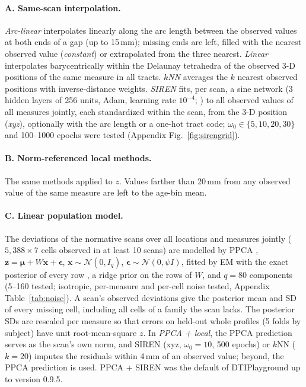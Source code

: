 \documentclass[11pt]{article}
\begin{document}
\paragraph{A. Same-scan interpolation.} \emph{Arc-linear} interpolates linearly along the arc length between the
observed values at both ends of a gap (up to 15\,mm); missing ends are left, filled with the nearest observed value
(\emph{constant}) or extrapolated from the three nearest. \emph{Linear} interpolates barycentrically within the Delaunay
tetrahedra of the observed 3-D positions of the same measure in all tracts. \emph{$k$NN} averages the $k$ nearest
observed positions with inverse-distance weights. \emph{SIREN} \citep{sitzmann2020siren} fits, per scan, a sine network
(3 hidden layers of 256 units, Adam, learning rate $10^{-4}$; \citealp{kingma2015adam}) to all observed values of all
measures jointly, each standardized within the scan, from the 3-D position (\emph{xyz}), optionally with the arc length
or a one-hot tract code; $\omega_0\in\{5,10,20,30\}$ and 100--1000 epochs were tested (Appendix
Fig.~\ref{fig:sirengrid}).

\paragraph{B. Norm-referenced local methods.} The same methods applied to $z$. Values farther than 20\,mm from any
observed value of the same measure are left to the age-bin mean.

\paragraph{C. Linear population model.} The deviations of the normative scans over all locations and measures jointly
($5{,}388\times7$ cells observed in at least 10 scans) are modelled by PPCA \citep{tipping1999ppca},
$\mathbf z=\boldsymbol\mu+W\mathbf x+\boldsymbol\epsilon$, $\mathbf x\sim\mathcal N(0,I_q)$,
$\boldsymbol\epsilon\sim\mathcal N(0,\psi I)$, fitted by EM with the exact posterior of every row
\citep{ilin2010pca}, a ridge prior on the rows of $W$, and $q=80$ components (5--160 tested; isotropic, per-measure and
per-cell noise tested, Appendix Table~\ref{tab:noise}). A scan's observed deviations give the posterior mean and SD of
every missing cell, including all cells of a family the scan lacks. The posterior SDs are rescaled per measure so that
errors on held-out whole profiles (5 folds by subject) have unit root-mean-square $z$. In \emph{PPCA + local}, the PPCA
prediction serves as the scan's own norm, and SIREN (xyz, $\omega_0=10$, 500 epochs) or $k$NN ($k=20$) imputes the
residuals within 4\,mm of an observed value; beyond, the PPCA prediction is used. PPCA + SIREN was the default of
DTIPlayground up to version 0.9.5.
\end{document}
